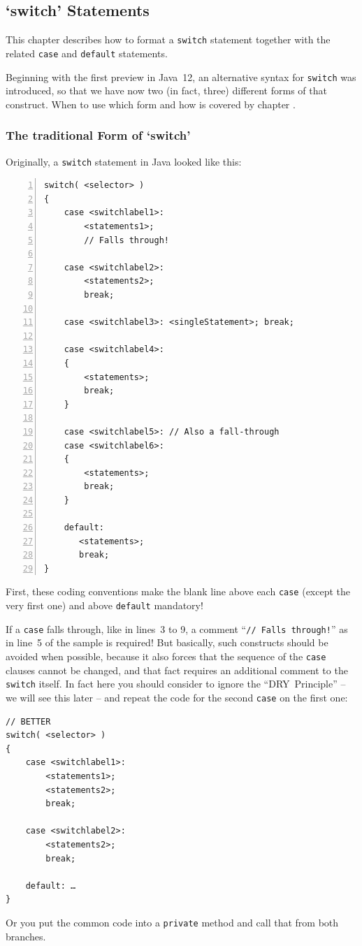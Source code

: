 \subsection{‘switch’ Statements}
This chapter describes how to format a \lstinline|switch| statement together with the related \lstinline|case| and \lstinline|default| statements.

Beginning with the first preview in Java~12, an alternative syntax for \lstinline|switch| was introduced, so that we have now two (in fact, three) different forms of that construct. When to use which form and how is covered by chapter .


\subsubsection{The traditional Form of ‘switch’}
Originally, a \lstinline|switch| statement in Java looked like this:
\begin{lstlisting}[numbers=left]
switch( <selector> )
{
    case <switchlabel1>:
        <statements1>;
        // Falls through!

    case <switchlabel2>:
        <statements2>;
        break;

    case <switchlabel3>: <singleStatement>; break;

    case <switchlabel4>:
    {
        <statements>;
        break;
    }

    case <switchlabel5>: // Also a fall-through
    case <switchlabel6>:
    {
        <statements>;
        break;
    }

    default:
       <statements>;
       break;
}
\end{lstlisting}

First, these coding conventions make the blank line above each \lstinline|case| (except the very first one) and above \lstinline|default| mandatory!
  
If a \lstinline|case| falls through, like in lines~3 to 9, a comment “\lstinline|// Falls through!|” as in line~5 of the sample is required! But basically, such constructs should be avoided when possible, because it also forces that the sequence of the \lstinline|case| clauses cannot be changed, and that fact requires an additional comment to the \lstinline|switch| itself. In fact here you should consider to ignore the “DRY~Principle” – we will see this later – and repeat the code for the second \lstinline|case| on the first one:
\begin{lstlisting}
// BETTER
switch( <selector> )
{
    case <switchlabel1>:
        <statements1>;
        <statements2>;
        break;

    case <switchlabel2>:
        <statements2>;
        break;

    default: …
}
\end{lstlisting}
Or you put the common code into a \lstinline|private| method and call that from both branches. 

